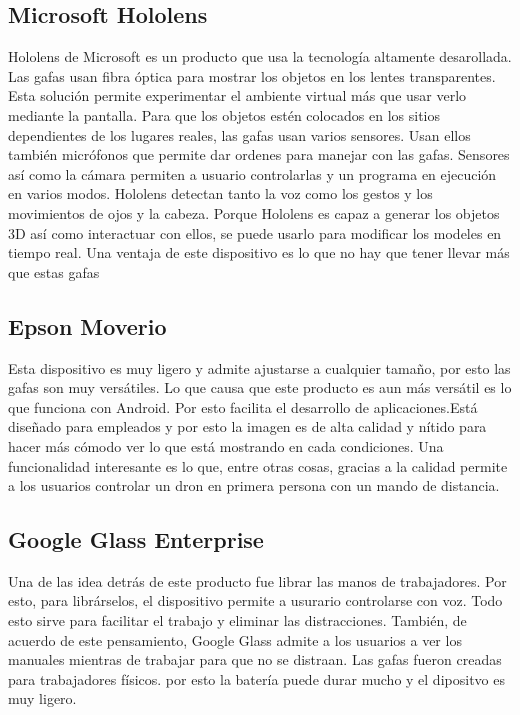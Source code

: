 \documentclass[a4paper,11pt]{scrartcl}
\begin{document}
\subsection{Microsoft Hololens}
Hololens de Microsoft\cite{hololens} es un producto que usa la tecnología altamente desarollada. Las gafas usan fibra óptica para mostrar los objetos en los lentes transparentes.
Esta solución permite experimentar el ambiente virtual más que usar verlo mediante la pantalla.
Para que los objetos estén colocados en los sitios dependientes de los lugares reales, las gafas usan varios sensores. Usan ellos también micrófonos que permite dar ordenes para manejar con las gafas. Sensores así como la cámara permiten a usuario controlarlas y un programa en ejecución en varios modos. Hololens detectan tanto la voz como los gestos y los movimientos de ojos y la cabeza. Porque Hololens es capaz a generar los objetos 3D así como interactuar con ellos, se puede usarlo para modificar los modeles en tiempo real. Una ventaja de este dispositivo es lo que no hay que tener llevar más que estas gafas




\subsection{Epson Moverio}
Esta dispositivo es muy ligero y admite ajustarse a cualquier tamaño, por esto las gafas son muy versátiles. Lo que causa que este producto es aun más versátil es lo que funciona con Android. Por esto facilita el desarrollo de aplicaciones.Está diseñado para empleados y por esto  la imagen es de alta calidad y nítido para hacer más cómodo ver lo que está mostrando en cada condiciones.
Una funcionalidad interesante es lo que, entre otras cosas, gracias a la calidad permite a los usuarios controlar un dron en primera persona con un mando de distancia.


\subsection{Google Glass Enterprise}
 Una de las idea detrás de este producto fue librar las manos de trabajadores. Por esto, para librárselos, el dispositivo permite a usurario controlarse con voz. Todo esto sirve para facilitar el trabajo y eliminar las distracciones. También, de acuerdo de este pensamiento, Google Glass admite a los usuarios a ver los manuales mientras de trabajar para que no se distraan. Las gafas fueron creadas para trabajadores físicos. por esto la batería puede durar mucho y el dipositvo es muy ligero.
\end{document}
